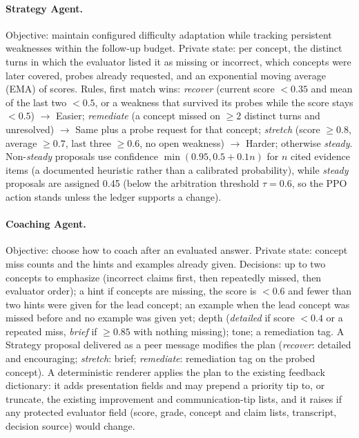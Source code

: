 \paragraph{Strategy Agent.} Objective: maintain configured difficulty adaptation while tracking persistent weaknesses within the follow-up budget. Private state: per concept, the distinct turns in which the evaluator listed it as missing or incorrect, which concepts were later covered, probes already requested, and an exponential moving average (EMA) of scores. Rules, first match wins: \emph{recover} (current score $<0.35$ and mean of the last two $<0.5$, or a weakness that survived its probes while the score stays $<0.5$) $\rightarrow$ Easier; \emph{remediate} (a concept missed on $\ge 2$ distinct turns and unresolved) $\rightarrow$ Same plus a probe request for that concept; \emph{stretch} (score $\ge0.8$, average $\ge0.7$, last three $\ge0.6$, no open weakness) $\rightarrow$ Harder; otherwise \emph{steady}. Non-\emph{steady} proposals use confidence $\min(0.95, 0.5{+}0.1n)$ for $n$ cited evidence items (a documented heuristic rather than a calibrated probability), while \emph{steady} proposals are assigned 0.45 (below the arbitration threshold $\tau = 0.6$, so the PPO action stands unless the ledger supports a change).

\paragraph{Coaching Agent.} Objective: choose how to coach after an evaluated answer. Private state: concept miss counts and the hints and examples already given. Decisions: up to two concepts to emphasize (incorrect claims first, then repeatedly missed, then evaluator order); a hint if concepts are missing, the score is $<0.6$ and fewer than two hints were given for the lead concept; an example when the lead concept was missed before and no example was given yet; depth (\emph{detailed} if score $<0.4$ or a repeated miss, \emph{brief} if $\ge0.85$ with nothing missing); tone; a remediation tag. A Strategy proposal delivered as a peer message modifies the plan (\emph{recover}: detailed and encouraging; \emph{stretch}: brief; \emph{remediate}: remediation tag on the probed concept). A deterministic renderer applies the plan to the existing feedback dictionary: it adds presentation fields and may prepend a priority tip to, or truncate, the existing improvement and communication-tip lists, and it raises if any protected evaluator field (score, grade, concept and claim lists, transcript, decision source) would change.

